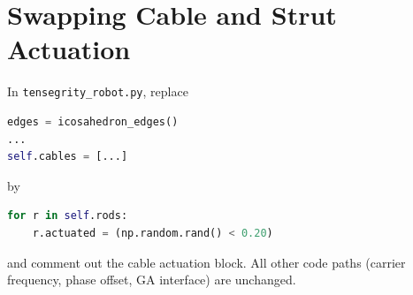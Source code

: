 \documentclass[12pt,letterpaper]{article}
\begin{document}
\section{Swapping Cable and Strut Actuation}
\label{sec:swap-actuation}

In \texttt{tensegrity\_robot.py}, replace

\begin{lstlisting}[language=Python, caption=Excerpt from N\_pendulum.py (Matrix Construction)]
edges = icosahedron_edges()
...
self.cables = [...]
\end{lstlisting}

by

\begin{lstlisting}[language=Python, caption=Excerpt from N\_pendulum.py (Matrix Construction)]
for r in self.rods:
    r.actuated = (np.random.rand() < 0.20)
\end{lstlisting}

and comment out the cable actuation block.  All other code paths
(carrier frequency, phase offset, GA interface) are unchanged.
\end{document}
